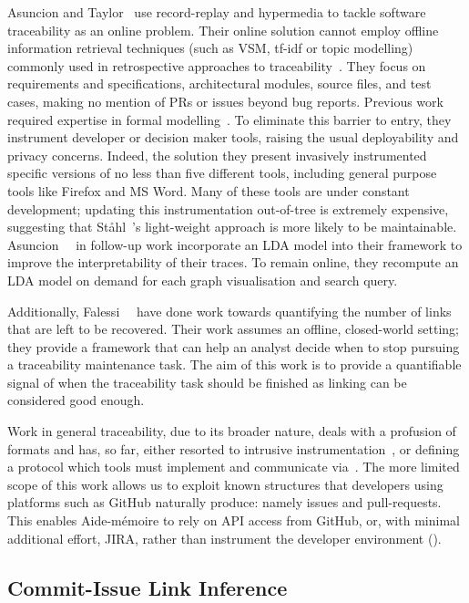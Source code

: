 Asuncion and Taylor~\cite{Asuncion:2009:CCL:1556908.1557008} use record-replay
and hypermedia to tackle software traceability as an online problem. Their
online solution cannot employ offline information retrieval techniques (such as
VSM, tf-idf or topic modelling) commonly used in retrospective approaches to
traceability~\cite{4249808}. They focus on requirements and specifications,
architectural modules, source files, and test cases, making no mention of PRs or
issues beyond bug reports. Previous work required expertise in formal
modelling~\cite{Pohl96, Pinheiro96}. To eliminate this barrier to entry, they
instrument developer or decision maker tools, raising the usual deployability
and privacy concerns. Indeed, the solution they present invasively instrumented
specific versions of no less than five different tools, including general
purpose tools like Firefox and MS Word. Many of these tools are under constant
development; updating this instrumentation out-of-tree is extremely expensive,
suggesting that St{\aa}hl~\etal's light-weight approach is more likely to be
maintainable. Asuncion~\etal~\cite{TopicTraceability} in follow-up work
incorporate an LDA model into their framework to improve the interpretability of
their traces. To remain online, they recompute an LDA model on demand for each
graph visualisation and search query.

Additionally, Falessi~\etal~\cite{Falessi2017} have done work towards
quantifying the number of links that are left to be recovered. Their work
assumes an offline, closed-world setting; they provide a framework that can help
an analyst decide when to stop pursuing a traceability maintenance task. The aim
of this work is to provide a quantifiable signal of when the traceability task
should be finished as linking can be considered good enough.

Work in general traceability, due to its broader nature, deals with a profusion
of formats and has, so far, either resorted to intrusive
instrumentation~\cite{Asuncion:2009:CCL:1556908.1557008, TopicTraceability}, or
defining a protocol which tools must implement and communicate
via~\cite{Stahl2017}. The more limited scope of this work allows us to exploit
known structures that developers using platforms such as GitHub naturally
produce: namely issues and pull-requests. This enables Aide-mémoire to rely on
API access from GitHub, or, with minimal additional effort, JIRA, rather than
instrument the developer environment ().

\subsection{Commit-Issue Link Inference}
\label{chapter:literature:sec:am_rel_work:cli}

